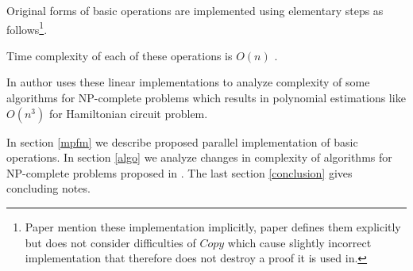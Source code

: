 Original forms of basic operations are implemented using elementary steps as follows\footnote{Paper \cite{Amos:1997} mention these implementation implicitly, paper \cite{Katsanyi:2003} defines them explicitly but does not consider difficulties of $Copy$ which cause slightly incorrect implementation that therefore does not destroy a proof it is used in.}.




Time complexity of each of these operations is $O(n)$ \cite{Amos:1997, Katsanyi:2003}.

In \cite{Katsanyi:2003} author uses these linear implementations to analyze complexity of some algorithms for NP-complete problems which results in polynomial estimations like $O(n^3)$ for Hamiltonian circuit problem.

In section \ref{mpfm} we describe proposed parallel implementation of basic operations. In section \ref{algo} we analyze changes in complexity of algorithms for NP-complete problems proposed in \cite{Katsanyi:2003}. The last section \ref{conclusion} gives concluding notes.